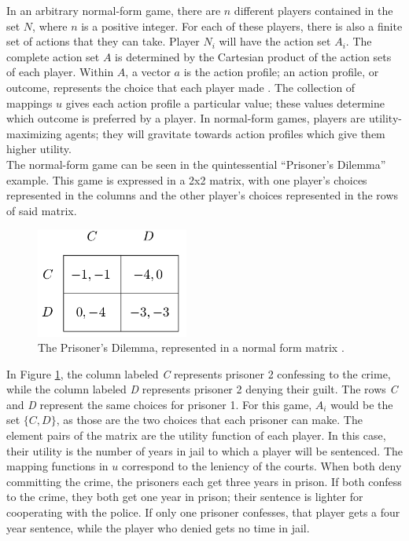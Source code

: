 In an arbitrary normal-form game, there are $n$ different players contained in the set $N$, where $n$ is a positive integer. For each of these players, there is also a finite set of actions that they can take. Player $N_i$ will have the action set $A_i$. The complete action set $A$ is determined by the Cartesian product of the action sets of each player. Within $A$, a vector $a$ is the action profile; an action profile, or outcome, represents the choice that each player made \cite{osbo94}. The collection of mappings $u$ gives each action profile a particular value; these values determine which outcome is preferred by a player. In normal-form games, players are utility-maximizing agents; they will gravitate towards action profiles which give them higher utility.\\

The normal-form game can be seen in the quintessential ``Prisoner's Dilemma'' example. This game is expressed in a 2x2 matrix, with one player's choices represented in the columns and the other player's choices represented in the rows of said matrix.

\begin{figure}[h]
  \centering
  \includegraphics[width=5cm]{figures/ExampleGrid.png}
  \caption{The Prisoner's Dilemma, represented in a normal form matrix \cite{shoh09}.}
  \label{fig:prisoner}
\end{figure}

In Figure \ref{fig:prisoner}, the column labeled \textit{C} represents prisoner 2 confessing to the crime, while the column labeled \textit{D} represents prisoner 2 denying their guilt. The rows \textit{C} and \textit{D} represent the same choices for prisoner 1. For this game, $A_i$ would be the set $\{C, D\}$, as those are the two choices that each prisoner can make. The element pairs of the matrix are the utility function of each player. In this case, their utility is the number of years in jail to which a player will be sentenced. The mapping functions in $u$ correspond to the leniency of the courts. When both deny committing the crime, the prisoners each get three years in prison. If both confess to the crime, they both get one year in prison; their sentence is lighter for cooperating with the police. If only one prisoner confesses, that player gets a four year sentence, while the player who denied gets no time in jail.\\

